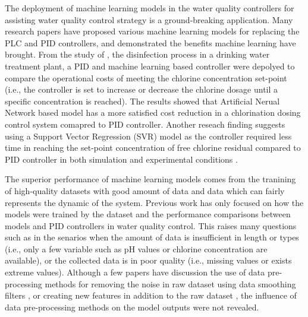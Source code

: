 
The deployment of machine learning models in the water quality controllers for assisting water quality control strategy is a ground-breaking application. Many research papers have proposed various machine learning models for replacing the PLC and PID controllers, and demonstrated the benefits machine learning have brought. From the study of \citep{librantzArtificialNeuralNetworks2018}, the disinfection process in a drinking water treatment plant, a PID and machine learning based controller were depolyed to compare the operational costs of meeting the chlorine concentration set-point (i.e., the controller is set to increase or decrease the chlorine dosage until a specific concentration is reached). The results showed that Artificial Nerual Network based model has a more satisfied cost reduction in a chlorination dosing control system comapred to PID controller. Another reseach finding suggests using a Support Vector Regression (SVR) model as the controller required less time in reaching the set-point concentration of free chlorine residual compared to PID controller in both simulation and experimental conditions \citet{wangModelPredictiveControl2020}.

The superior performance of machine learning models comes from the tranining of high-quality datasets with good amount of data and data which can fairly represents the dynamic of the system. Previous work has only focused on how the models were trained by the dataset and the performance comparisons between models and PID controllers in water quality control. This raises many questions such as in the senarios when the amount of data is insufficient in length or types (i.e., only a few variable such as pH values or chlorine concentration are available), or the collected data is in poor quality (i.e., missing values or exists extreme values). Although a few papers have discussion the use of data pre-processing methods for removing the noise in raw dataset using data smoothing filters \citep{chengForecastingWastewaterTreatment2020}, or creating new features in addition to the raw dataset \citep{mamandipoorMonitoringDetectingFaults2020}, the influence of data pre-processing methods on the model outputs were not revealed.

